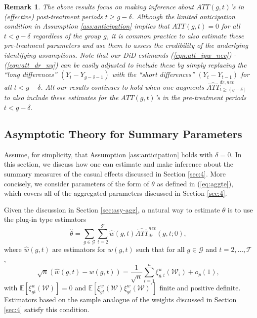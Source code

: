 \documentclass[11pt]{article}%
\theoremstyle{plain}
\newtheorem{remark}{Remark}
\numberwithin{sassumption}{section}
\numberwithin{equation}{section}
\begin{document}
\begin{remark}
 The above results focus on making inference about $ATT(g,t)$'s in (effective) post-treatment periods $t \ge g - \delta$. Although the limited anticipation condition in Assumption \ref{ass:anticipation} implies that $ATT(g,t)=0$ for all $t < g - \delta$  regardless of the group $g$, it is common practice to also estimate these pre-treatment parameters and use them to assess the credibility of the underlying identifying assumptions. Note that our DiD estimands (\ref{eqn:att_ipw_nev}) - (\ref{eqn:att_dr_ny}) can be easily adjusted to include these by simply replacing the ``long differences'' $(Y_{t} - Y_{g-\delta-1})$ with the ``short differences''  $(Y_{t} - Y_{t-1})$ for all $t < g - \delta$. All our results continues to hold when one augments $\widehat{ATT}_{t\geq\left(  g-\delta\right)  }^{dr,nev}$ to also include these estimates for the $ATT(g,t)$'s in the pre-treatment periods $t < g - \delta$.
\end{remark}

\subsection{Asymptotic Theory for Summary Parameters}

Assume, for simplicity, that Assumption \ref{ass:anticipation} holds with
$\delta=0$. In this section, we discuss how one can estimate and make
inference about the summary measures of the casual effects discussed in
Section \ref{sec:4}. More concisely, we consider parameters of the form of
$\theta$ as defined in (\ref{eq:aggte}), which covers all of the aggregated
parameters discussed in Section \ref{sec:4}.

Given the discussion in Section \ref{sec:asy-agg}, a natural way to estimate
$\theta$ is to use the plug-in type estimators
\[
\hat{\theta}=\sum_{g\in\mathcal{G}}\sum_{t=2}^{\mathcal{T}}\widehat{w}\left(
g,t\right)  \widehat{ATT}_{dr}^{nev}\left(  g,t;0\right)  ,
\]
where $\widehat{w}\left(  g,t\right)  $ are estimators for $w\left(
g,t\right)  $ such that for all $g\in\mathcal{G}$ and $t=2,\dots,\mathcal{T}%
$,
\[
\sqrt{n}\left(  \widehat{w}\left(  g,t\right)  -w\left(  g,t\right)  \right)
=\frac{1}{\sqrt{n}}\sum_{i=1}^{n}\xi_{g,t}^{w}(\mathcal{W}_{i})+o_{p}\left(
1\right)  ,
\]
with $\mathbb{E}\left[  \xi_{gt}^{w}(\mathcal{W})\right]  =0$ and
$\mathbb{E}\left[  \xi_{gt}^{w}(\mathcal{W})\xi_{gt}^{w}(\mathcal{W})^{\prime
}\right]  $ finite and positive definite. Estimators based on the sample
analogue of the weights discussed in Section \ref{sec:4} satisfy this condition.
\end{document}
